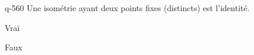 \begin{truefalse}{q-560}
Une isométrie  ayant deux points fixes (distincts) est l'identité.
\item Vrai
\item* Faux
\end{truefalse}

